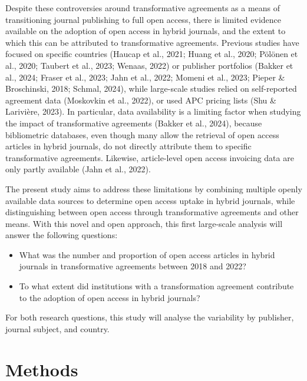 \documentclass[a4paper,man,floatsintext,longtable,noextraspace,12pt]{apa6}
\providecommand{\tightlist}{%
  \setlength{\itemsep}{0pt}\setlength{\parskip}{0pt}}
\begin{document}
Despite these controversies around transformative agreements as a means
of transitioning journal publishing to full open access, there is
limited evidence available on the adoption of open access in hybrid
journals, and the extent to which this can be attributed to
transformative agreements. Previous studies have focused on specific
countries (Haucap et al., 2021; Huang et al., 2020; Pölönen et al.,
2020; Taubert et al., 2023; Wenaas, 2022) or publisher portfolios
(Bakker et al., 2024; Fraser et al., 2023; Jahn et al., 2022; Momeni et
al., 2023; Pieper \& Broschinski, 2018; Schmal, 2024), while large-scale
studies relied on self-reported agreement data (Moskovkin et al., 2022),
or used APC pricing lists (Shu \& Larivière, 2023). In particular, data
availability is a limiting factor when studying the impact of
transformative agreements (Bakker et al., 2024), because bibliometric
databases, even though many allow the retrieval of open access articles
in hybrid journals, do not directly attribute them to specific
transformative agreements. Likewise, article-level open access invoicing
data are only partly available (Jahn et al., 2022).

The present study aims to address these limitations by combining
multiple openly available data sources to determine open access uptake
in hybrid journals, while distinguishing between open access through
transformative agreements and other means. With this novel and open
approach, this first large-scale analysis will answer the following
questions:

\begin{itemize}
\tightlist
\item
  What was the number and proportion of open access articles in hybrid
  journals in transformative agreements between 2018 and 2022?
\item
  To what extent did institutions with a transformation agreement
  contribute to the adoption of open access in hybrid journals?
\end{itemize}

For both research questions, this study will analyse the variability by
publisher, journal subject, and country.

\hypertarget{methods}{%
\section{Methods}\label{methods}}
\end{document}
